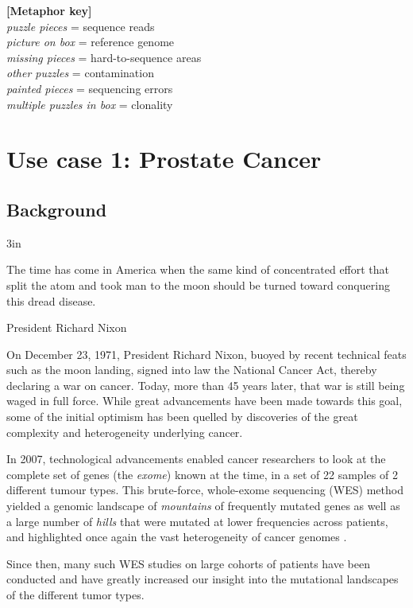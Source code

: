 \begin{center}
\begin{minipage}{6in}
\begin{center}
{\vspace*{0.5cm}
\textbf{[Metaphor key]} \\
\textit{puzzle pieces} = sequence reads \\
\textit{picture on box} = reference genome \\
\textit{missing pieces} = hard-to-sequence areas \\
\textit{other puzzles} = contamination \\
\textit{painted pieces} = sequencing errors \\
\textit{multiple puzzles in box} = clonality
}

\end{center}
\end{minipage}
\end{center}



\newpage
\section{Use case 1: Prostate Cancer}
\subsection{Background}
\epigraph{3in}{The time has come in America when the same kind of concentrated effort that split the atom and took man to the moon should be turned toward conquering this dread disease.}{President Richard Nixon}

On December 23, 1971, President Richard Nixon, buoyed by recent technical feats such as the moon landing, signed into law the National Cancer Act, thereby declaring a war on cancer. Today, more than 45 years later, that war is still being waged in full force. While great advancements have been made towards this goal, some of the initial optimism has been quelled by discoveries of the great complexity and heterogeneity underlying cancer.

In 2007, technological advancements enabled cancer researchers to look at the complete set of genes (the \textit{exome}) known at the time, in a set of 22 samples of 2 different tumour types. This brute-force, whole-exome sequencing (WES) method yielded a genomic landscape of \textit{mountains} of frequently mutated genes as well as a large number of \textit{hills} that were mutated at lower frequencies across patients, and highlighted once again the vast heterogeneity of cancer genomes \cite{wood2007genomic}.

Since then, many such WES studies on large cohorts of patients have been conducted \cite{wheeler2013human} and have greatly increased our insight into the mutational landscapes of the different tumor types.

